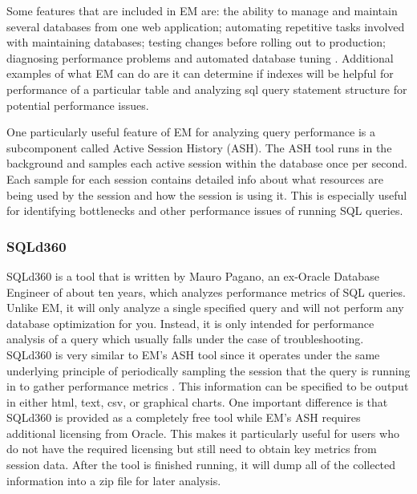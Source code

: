 \documentclass[draftclsnofoot, onecolumn, compsoc, 10pt]{IEEEtran}
\begin{document}
Some features that are included in EM are: the ability to manage and maintain several databases from one web application; automating repetitive tasks involved with maintaining databases; testing changes before rolling out to production; diagnosing performance problems and automated database tuning \cite{Manageability with Oracle Database 12c}. 
Additional examples of what EM can do are it can determine if indexes will be helpful for performance of a particular table and analyzing sql query statement structure for potential performance issues.

One particularly useful feature of EM for analyzing query performance is a subcomponent called Active Session History (ASH). 
The ASH tool runs in the background and samples each active session within the database once per second. 
Each sample for each session contains detailed info about what resources are being used by the session and how the session is using it. 
This is especially useful for identifying bottlenecks and other performance issues of running SQL queries.

\subsubsection{SQLd360}
SQLd360 is a tool that is written by Mauro Pagano, an ex-Oracle Database Engineer of about ten years, which analyzes performance metrics of SQL queries.
Unlike EM, it will only analyze a single specified query and will not perform any database optimization for you.  
Instead, it is only intended for performance analysis of a query which usually falls under the case of troubleshooting. 
SQLd360 is very similar to EM’s ASH tool since it operates under the same underlying principle of periodically sampling the session that the query is running in to gather performance metrics \cite{Mauro Pagano's Blog}. 
This information can be specified to be output in either html, text, csv, or graphical charts. One important difference is that SQLd360 is provided as a completely free tool while EM’s ASH requires additional licensing from Oracle. 
This makes it particularly useful for users who do not have the required licensing but still need to obtain key metrics from session data. 
After the tool is finished running, it will dump all of the collected information into a zip file for later analysis.
\end{document}
